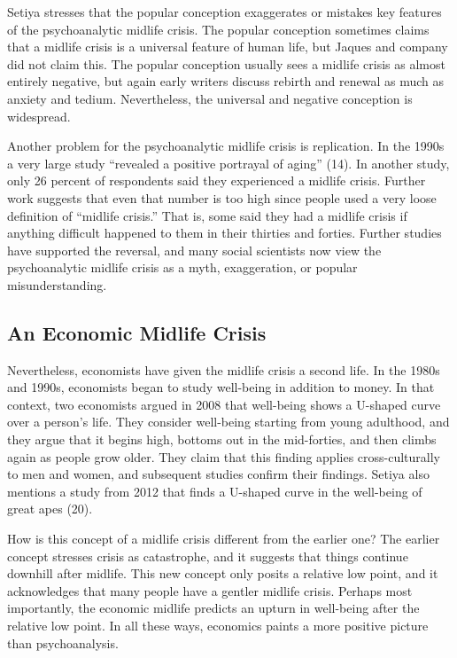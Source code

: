 \documentclass[12pt,letterpaper]{article}
\begin{document}
Setiya stresses that the popular conception exaggerates or mistakes key features of the psychoanalytic midlife crisis.
The popular conception sometimes claims that a midlife crisis is a universal feature of human life, but Jaques and company did not claim this.
The popular conception usually sees a midlife crisis as almost entirely negative, but again early writers discuss rebirth and renewal as much as anxiety and tedium.
Nevertheless, the universal and negative conception is widespread.

Another problem for the psychoanalytic midlife crisis is replication.
In the 1990s a very large study ``revealed a positive portrayal of aging'' (14).
In another study, only 26 percent of respondents said they experienced a midlife crisis.
Further work suggests that even that number is too high since people used a very loose definition of ``midlife crisis.''
That is, some said they had a midlife crisis if anything difficult happened to them in their thirties and forties.
Further studies have supported the reversal, and many social scientists now view the psychoanalytic midlife crisis as a myth, exaggeration, or popular misunderstanding.

\subsection*{An Economic Midlife Crisis}

Nevertheless, economists have given the midlife crisis a second life.
In the 1980s and 1990s, economists began to study well-being in addition to money.
In that context, two economists argued in 2008 that well-being shows a U-shaped curve over a person's life.
They consider well-being starting from young adulthood, and they argue that it begins high, bottoms out in the mid-forties, and then climbs again as people grow older.
They claim that this finding applies cross-culturally to men and women, and subsequent studies confirm their findings.
Setiya also mentions a study from 2012 that finds a U-shaped curve in the well-being of great apes (20).

How is this concept of a midlife crisis different from the earlier one?
The earlier concept stresses crisis as catastrophe, and it suggests that things continue downhill after midlife.
This new concept only posits a relative low point, and it acknowledges that many people have a gentler midlife crisis.
Perhaps most importantly, the economic midlife predicts an upturn in well-being after the relative low point.
In all these ways, economics paints a more positive picture than psychoanalysis.
\end{document}
